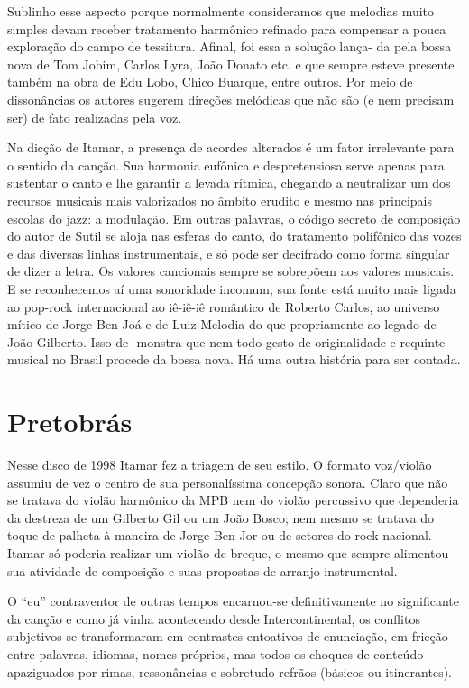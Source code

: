 Sublinho esse aspecto porque normalmente consideramos que melodias muito
simples devam receber tratamento harmônico refinado para compensar a
pouca exploração do campo de tessitura. Afinal, foi essa a solução
lança- da pela bossa nova de Tom Jobim, Carlos Lyra, João Donato etc. e
que sempre esteve presente também na obra de Edu Lobo, Chico Buarque,
entre outros. Por meio de dissonâncias os autores sugerem direções
melódicas que não são (e nem precisam ser) de fato realizadas pela voz.

Na dicção de Itamar, a presença de acordes alterados é um fator
irrelevante para o sentido da canção. Sua harmonia eufônica e
despretensiosa serve apenas para sustentar o canto e lhe garantir a
levada rítmica, chegando a neutralizar um dos recursos musicais mais
valorizados no âmbito erudito e mesmo nas principais escolas do jazz: a
modulação. Em outras palavras, o código secreto de composição do autor
de Sutil se aloja nas esferas do canto, do tratamento polifônico das
vozes e das diversas linhas instrumentais, e só pode ser decifrado como
forma singular de dizer a letra. Os valores cancionais sempre se
sobrepõem aos valores musicais. E se reconhecemos aí uma sonoridade
incomum, sua fonte está muito mais ligada ao pop-rock internacional ao
iê-iê-iê romântico de Roberto Carlos, ao universo mítico de Jorge Ben
Joá e de Luiz Melodia do que propriamente ao legado de João Gilberto.
Isso de- monstra que nem todo gesto de originalidade e requinte musical
no Brasil procede da bossa nova. Há uma outra história para ser contada.

\section{Pretobrás}

Nesse disco de 1998 Itamar fez a triagem de seu estilo. O formato
voz/violão assumiu de vez o centro de sua personalíssima concepção
sonora. Claro que não se tratava do violão harmônico da MPB nem do
violão percussivo que dependeria da destreza de um Gilberto Gil ou um
João Bosco; nem mesmo se tratava do toque de palheta à maneira de Jorge
Ben Jor ou de setores do rock nacional. Itamar só poderia realizar um
violão-de-breque, o mesmo que sempre alimentou sua atividade de
composição e suas propostas de arranjo instrumental.

O ``eu'' contraventor de outras tempos encarnou-se definitivamente no
significante da canção e como já vinha acontecendo desde
Intercontinental, os conflitos subjetivos se transformaram em contrastes
entoativos de enunciação, em fricção entre palavras, idiomas, nomes
próprios, mas todos os choques de conteúdo apaziguados por rimas,
ressonâncias e sobretudo refrãos (básicos ou itinerantes).

